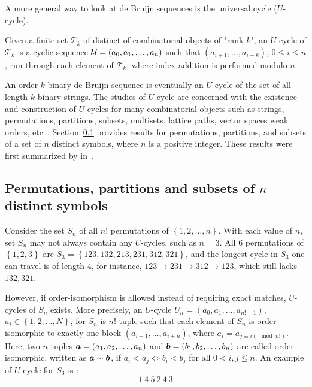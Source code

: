 A more general way to look at de Bruijn sequences is the universal cycle ($U$-cycle). 
\begin{definition}
    Given a finite set $\mathcal{T}_{k}$ of distinct of combinatorial objects of "rank $k$", an $U$-cycle of $\mathcal{T}_{k}$ is a cyclic sequence ${\cal U}=(a_0,a_1,\ldots,a_n)$ such that $(a_{i+1},\ldots,a_{i+k})$, $0\leq i\leq n$, run through each element of $\mathcal{T}_{k}$, where index addition is performed modulo $n$.
\end{definition} 
An order $k$ binary de Bruijn sequence is eventually an $U$-cycle of the set of all length $k$ binary strings. The studies of $U$-cycle are concerned with the existence and construction of $U$-cycles for many combinatorial objects such as strings, permutations, partitions, subsets, multisets, lattice paths, vector spaces weak orders, etc~\cite{chung1992universal,horan2013universal,jackson2009research,johnson2009universal,hurlbert2009universal,jackson2009recursive}. Section~\ref{subsect:fanchung} provides results for permutations, partitions, and subsets of a set of $n$ distinct symbols, where $n$ is a positive integer. These results were first summarized by \citeauthor{chung1992universal} in~\cite{chung1992universal}.

\subsection{Permutations, partitions and subsets of \texorpdfstring{$n$}{n} distinct symbols}\label{subsect:fanchung}
Consider the set $S_{n}$ of all $n!$ permutations of $\left\{1,2,\ldots,n\right\}$. With each value of $n$, set $S_{n}$ may not always contain any $U$-cycles, such as $n=3$. All $6$ permutations of $\left\{1,2,3\right\}$ are $S_{3}=\left\{123,132,213,231,312,321\right\}$, and the longest cycle in $S_{3}$ one can travel is of length $4$, for instance,  $123\rightarrow231\rightarrow312\rightarrow123$, which still lacks $132, 321$. 

However, if order-isomorphism is allowed instead of requiring exact matches, $U$-cycles of $S_{n}$ exists. More precisely, an $U$-cycle $U_{n}=(a_{0},a_{1},\ldots,a_{n!-1})$, $a_{i}\in\left\{1,2,\ldots,N\right\}$, for $S_{n}$ is $n!$-tuple such that each element of $S_{n}$ is order-isomorphic to exactly one block $(a_{i+1},\ldots,a_{i+n})$, where $a_{i}=a_{j\equiv i(\mod n!)}$. Here, two $n$-tuples ${\boldsymbol a}=\left(a_{1},a_{2},\ldots,a_{n}\right)$ and ${\boldsymbol b}=\left(b_{1},b_{2},\ldots,b_{n}\right)$ are called order-isomorphic, written as ${\boldsymbol a}\sim{\boldsymbol b}$, if $a_{i}<a_{j} \Leftrightarrow b_{i}<b_{j}$ for all $0<i,j\leq n$. An example of $U$-cycle for $S_{3}$ is :
\[1\ 4\ 5\ 2\ 4 \ 3\]

